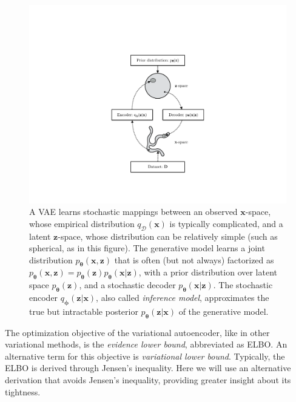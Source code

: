 \documentclass[MAL,biber]{nowfnt} %
\newcommand{\bb}[1]{\mathbf{#1}}
\newcommand{\bx}{\bb{x}}
\newcommand{\bz}{\bb{z}}
\newcommand{\bT}{\boldsymbol{\theta}}
\newcommand{\bphi}{\boldsymbol{\phi}}
\newcommand{\pT}{p_{\bT}}
\newcommand{\qP}{q_{\bphi}}
\newcommand{\qD}{q_\mathcal{D}}
\begin{document}
\begin{figure}
	\centering
	\includegraphics[width=0.90\linewidth]{figures/xspacezspace}
	\caption{A VAE learns stochastic mappings between an observed $\bx$-space, whose empirical distribution $\qD(\bx)$ is typically complicated, and a latent $\bz$-space, whose distribution can be relatively simple (such as spherical, as in this figure). The generative model learns a joint distribution $\pT(\bx,\bz)$ that is often (but not always) factorized as $\pT(\bx,\bz) = \pT(\bz) \pT(\bx|\bz)$, with a prior distribution over latent space $\pT(\bz)$, and a stochastic decoder $\pT(\bx|\bz)$. The stochastic encoder $\qP(\bz|\bx)$, also called \emph{inference model}, approximates the true but intractable posterior $\pT(\bz|\bx)$ of the generative model.}
	\label{fig:xspacezspace}
\end{figure}

The optimization objective of the variational autoencoder, like in other variational methods, is the \emph{evidence lower bound}, abbreviated as ELBO. An alternative term for this objective is \emph{variational lower bound}. Typically, the ELBO is derived through Jensen's inequality. Here we will use an alternative derivation that avoids Jensen's inequality, providing greater insight about its tightness.
\end{document}
